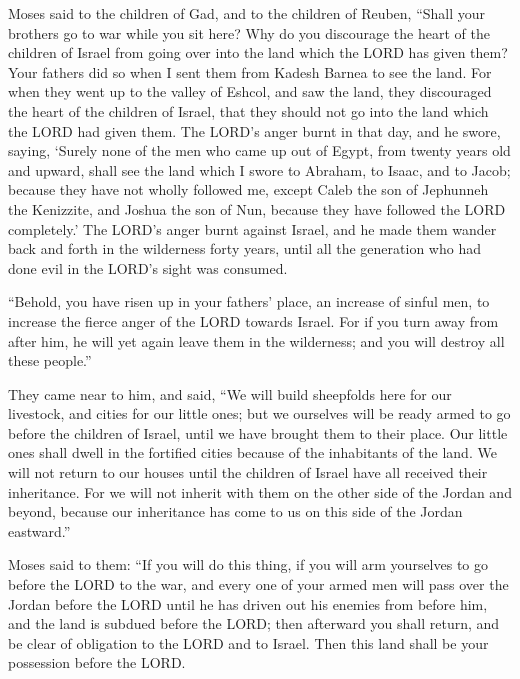  Moses said to the children of Gad, and to the children of
Reuben, ``Shall your brothers go to war while you sit here? 
Why do you discourage the heart of the children of Israel from going
over into the land which the LORD has given them?  Your
fathers did so when I sent them from Kadesh Barnea to see the land.
 For when they went up to the valley of Eshcol, and saw the
land, they discouraged the heart of the children of Israel, that they
should not go into the land which the LORD had given them. 
The LORD's anger burnt in that day, and he swore, saying, 
`Surely none of the men who came up out of Egypt, from twenty years old
and upward, shall see the land which I swore to Abraham, to Isaac, and
to Jacob; because they have not wholly followed me,  except
Caleb the son of Jephunneh the Kenizzite, and Joshua the son of Nun,
because they have followed the LORD completely.'  The
LORD's anger burnt against Israel, and he made them wander back and
forth in the wilderness forty years, until all the generation who had
done evil in the LORD's sight was consumed.

 ``Behold, you have risen up in your fathers' place, an
increase of sinful men, to increase the fierce anger of the LORD towards
Israel.  For if you turn away from after him, he will yet
again leave them in the wilderness; and you will destroy all these
people.''

 They came near to him, and said, ``We will build
sheepfolds here for our livestock, and cities for our little ones;
 but we ourselves will be ready armed to go before the
children of Israel, until we have brought them to their place. Our
little ones shall dwell in the fortified cities because of the
inhabitants of the land.  We will not return to our houses
until the children of Israel have all received their inheritance.
 For we will not inherit with them on the other side of the
Jordan and beyond, because our inheritance has come to us on this side
of the Jordan eastward.''

 Moses said to them: ``If you will do this thing, if you
will arm yourselves to go before the LORD to the war,  and
every one of your armed men will pass over the Jordan before the LORD
until he has driven out his enemies from before him,  and
the land is subdued before the LORD; then afterward you shall return,
and be clear of obligation to the LORD and to Israel. Then this land
shall be your possession before the LORD.

